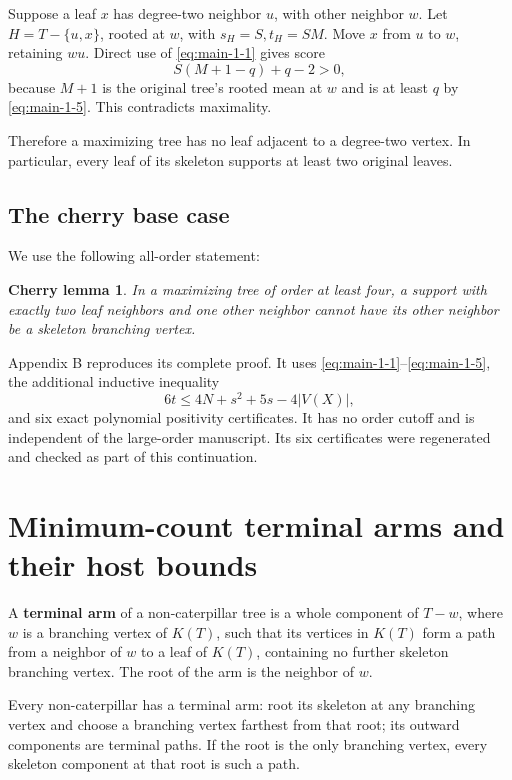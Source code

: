 \documentclass[11pt,reqno]{amsart}
\theoremstyle{plain}
\newtheorem*{cherrylemma}{Cherry lemma}
\begin{document}
Suppose a leaf \(x\) has degree-two neighbor \(u\), with other neighbor \(w\). Let \(H=T-\{u,x\}\), rooted at \(w\), with \(s_H=S,t_H=SM\). Move \(x\) from \(u\) to \(w\), retaining \(wu\). Direct use of \eqref{eq:main-1-1} gives score \[
S(M+1-q)+q-2>0,
\tag{1.7}\label{eq:main-1-7}
\] because \(M+1\) is the original tree's rooted mean at \(w\) and is at least \(q\) by \eqref{eq:main-1-5}. This contradicts maximality.

Therefore a maximizing tree has no leaf adjacent to a degree-two vertex. In particular, every leaf of its skeleton supports at least two original leaves.

\subsection{The cherry base case}\label{the-cherry-base-case}

We use the following all-order statement:

\begin{cherrylemma}\label{lem:cherry} In a maximizing tree of order at least four, a support with exactly two leaf neighbors and one other neighbor cannot have its other neighbor be a skeleton branching vertex.
\end{cherrylemma}

Appendix B reproduces its complete proof. It uses \eqref{eq:main-1-1}--\eqref{eq:main-1-5}, the additional inductive inequality \[
6t\le4N+s^2+5s-4|V(X)|,
\tag{1.8}\label{eq:main-1-8}
\] and six exact polynomial positivity certificates. It has no order cutoff and is independent of the large-order manuscript. Its six certificates were regenerated and checked as part of this continuation.

\section{Minimum-count terminal arms and their host bounds}\label{minimum-count-terminal-arms-and-their-host-bounds}

A \textbf{terminal arm} of a non-caterpillar tree is a whole component of \(T-w\), where \(w\) is a branching vertex of \(K(T)\), such that its vertices in \(K(T)\) form a path from a neighbor of \(w\) to a leaf of \(K(T)\), containing no further skeleton branching vertex. The root of the arm is the neighbor of \(w\).

Every non-caterpillar has a terminal arm: root its skeleton at any branching vertex and choose a branching vertex farthest from that root; its outward components are terminal paths. If the root is the only branching vertex, every skeleton component at that root is such a path.
\end{document}
